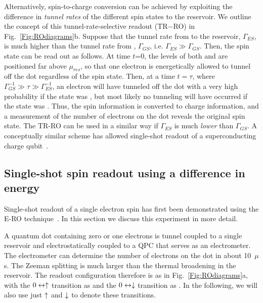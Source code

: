 \documentclass[rmp,twocolumn,aps]{revtex4}
\begin{document}
Alternatively, spin-to-charge conversion can be achieved by
exploiting the difference in \textit{tunnel rates} of the
different spin states to the reservoir. We outline the concept of
this tunnel-rate-selective readout (TR$-$RO) in
Fig.~\ref{Fig:ROdiagrams}b. Suppose that the tunnel rate from
 to the reservoir, $\Gamma_{ES}$, is much higher than
the tunnel rate from , $\Gamma_{GS}$, i.e.
$\Gamma_{ES}\gg\Gamma_{GS}$. Then, the spin state can be read out
as follows. At time $t$=0, the levels of both  and
 are positioned far above $\mu_{res}$, so that one
electron is energetically allowed to tunnel off the dot regardless
of the spin state. Then, at a time $t=\tau$, where
$\Gamma_{GS}^{-1}\gg \tau \gg \Gamma_{ES}^{-1}$, an electron will
have tunneled off the dot with a very high probability if the
state was , but most likely no tunneling will have
occurred if the state was . Thus, the spin information
is converted to charge information, and a measurement of the
number of electrons on the dot reveals the original spin state.
The TR-RO can be used in a similar way if $\Gamma_{ES}$ is much
\textit{lower} than $\Gamma_{GS}$. A conceptually similar
scheme has allowed single-shot readout of a superconducting charge
qubit~\cite{Astafiev04}.

\subsection{Single-shot spin readout using a difference in energy}
\label{Subsection:ERO}

Single-shot readout of a single electron spin has first been
demonstrated using the E-RO technique~\cite{ElzermanNature2004}.
In this section we discuss this experiment in more detail.

A quantum dot containing zero or one electrons is tunnel coupled
to a single reservoir and electrostatically coupled to a QPC that
serves as an electrometer. The electrometer can determine the
number of electrons on the dot in about 10~$\mu$s. The Zeeman
splitting is much larger than the thermal broadening in the
reservoir. The readout configuration therefore is as in
Fig.~\ref{Fig:ROdiagrams}a, with the $0\leftrightarrow \uparrow$
transition as   and the $0\leftrightarrow \downarrow$
transition as . In the following, we will also use just
$\uparrow$ and $\downarrow$ to denote these transitions.
\end{document}
